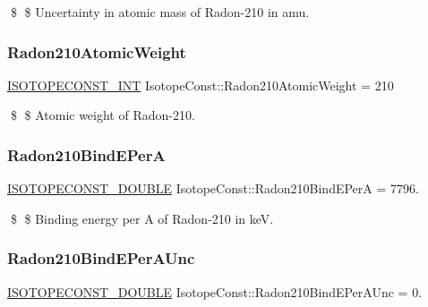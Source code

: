 \$ \$ Uncertainty in atomic mass of Radon-\/210 in amu. \mbox{\label{group___isotope_const-_radon-_rn210_ga6f73990ff1fdc7ec75bd23c4d96650aa}} 
\subsubsection{\texorpdfstring{Radon210\+Atomic\+Weight}{Radon210AtomicWeight}}
{\footnotesize\ttfamily \mbox{\hyperlink{group___isotope_const-_macros_ga5f18360b3e99483a35c32d789e62621c}{I\+S\+O\+T\+O\+P\+E\+C\+O\+N\+S\+T\+\_\+\+I\+NT}} Isotope\+Const\+::\+Radon210\+Atomic\+Weight = 210}

\$ \$ Atomic weight of Radon-\/210. \mbox{\label{group___isotope_const-_radon-_rn210_ga1c942107a58ad556d77f485633b527d9}} 
\subsubsection{\texorpdfstring{Radon210\+Bind\+E\+PerA}{Radon210BindEPerA}}
{\footnotesize\ttfamily \mbox{\hyperlink{group___isotope_const-_macros_ga8f45a7272ce02c0b4c65c44636ed719a}{I\+S\+O\+T\+O\+P\+E\+C\+O\+N\+S\+T\+\_\+\+D\+O\+U\+B\+LE}} Isotope\+Const\+::\+Radon210\+Bind\+E\+PerA = 7796.}

\$ \$ Binding energy per A of Radon-\/210 in keV. \mbox{\label{group___isotope_const-_radon-_rn210_ga19f09879a381acffe3bb6c82ef330386}} 
\subsubsection{\texorpdfstring{Radon210\+Bind\+E\+Per\+A\+Unc}{Radon210BindEPerAUnc}}
{\footnotesize\ttfamily \mbox{\hyperlink{group___isotope_const-_macros_ga8f45a7272ce02c0b4c65c44636ed719a}{I\+S\+O\+T\+O\+P\+E\+C\+O\+N\+S\+T\+\_\+\+D\+O\+U\+B\+LE}} Isotope\+Const\+::\+Radon210\+Bind\+E\+Per\+A\+Unc = 0.}

